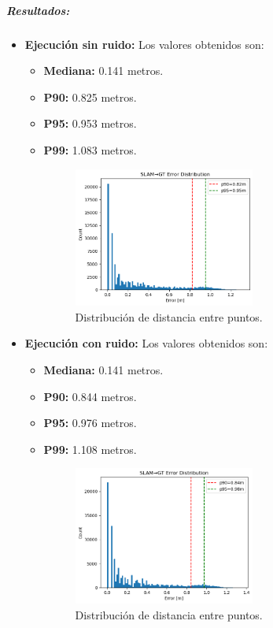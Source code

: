 \documentclass[12pt, a4paper, twoside]{article}
\begin{document}
\subparagraph{Resultados:}
\begin{itemize}
  \item \textbf{Ejecución sin ruido:} Los valores obtenidos son:
  \begin{itemize}
    \item \textbf{Mediana:} 0.141 metros. 
    \item \textbf{P90:} 0.825 metros.
    \item \textbf{P95:} 0.953 metros.
    \item \textbf{P99:} 1.083 metros.
    \begin{figure}[h]
      \centering
        \includegraphics[width=0.6\textwidth]{ed_clean.png}
        \caption{Distribución de distancia entre puntos.}
    \end{figure} 
    \end{itemize}
    \newpage
  \item \textbf{Ejecución con ruido:} Los valores obtenidos son:
  \begin{itemize}
    \item \textbf{Mediana:} 0.141 metros. 
    \item \textbf{P90:} 0.844 metros.
    \item \textbf{P95:} 0.976 metros.
    \item \textbf{P99:} 1.108 metros.
    \begin{figure}[h]
      \centering
        \includegraphics[width=0.6\textwidth]{ed_noisy.png}
      \caption{Distribución de distancia entre puntos.}
    \end{figure} 
  \end{itemize}
\end{itemize}
\end{document}
